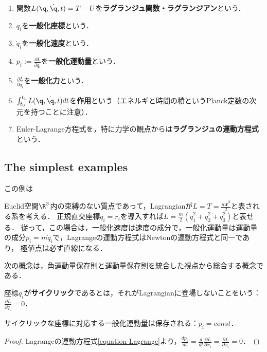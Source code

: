 \documentclass[uplatex, 12pt, dvipdfmx]{jsreport}
\begin{document}
\begin{definition}\mbox{}
    \begin{enumerate}
        \item 関数$L(\q,\dot{\q},t)=T-U$を\textbf{ラグランジュ関数・ラグランジアン}という．
        \item $q_i$を\textbf{一般化座標}という．
        \item $\dot{q}_i$を\textbf{一般化速度}という．
        \item $p_i:=\frac{\partial L}{\partial\dot{q}_i}$を\textbf{一般化運動量}という．
        \item $\frac{\partial L}{\partial q_i}$を\textbf{一般化力}という．
        \item $\int^{t_1}_{t_0}L(\q,\dot{\q},t)dt$を\textbf{作用}という（エネルギと時間の積というPlanck定数の次元を持つことに注意）．
        \item Euler-Lagrange方程式を，特に力学の観点からは\textbf{ラグランジュの運動方程式}という．
    \end{enumerate}
\end{definition}

\subsection{The simplest examples}
この例は

\begin{example}[等速直線運動または静止]
    Euclid空間$\R^3$内の束縛のない質点であって，Lagrangianが$L=T=\frac{m\dot{\mathbf{r}}^2}{2}$と表される系を考える．
    正規直交座標$q_i=r_i$を導入すれば$L=\frac{m}{2}(\dot{q}_1^2+\dot{q}_2^2+\dot{q}_3^2)$と表せる．
    従って，この場合は，一般化速度は速度の成分で，一般化運動量は運動量の成分$p_i=m\dot{q}_i$で，Lagrangeの運動方程式はNewtonの運動方程式と同一であり，
    極値点は必ず直線になる．
\end{example}

\begin{example}[角運動量保存則の言い換え]
    
\end{example}

次の概念は，角運動量保存則と運動量保存則を統合した視点から総合する概念である．

\begin{definition}
    座標$q_i$が\textbf{サイクリック}であるとは，それがLagrangianに登場しないことをいう：$\frac{\partial L}{\partial\dot{q}_i}=0$．
\end{definition}
\begin{theorem}
    サイクリックな座標に対応する一般化運動量は保存される：$p_i=const$．
\end{theorem}
\begin{proof}
    Lagrangeの運動方程式\ref{equation-Lagrange}より，$\frac{dp_i}{dt}=\frac{d}{dt}\frac{\partial L}{\partial \dot{x}_i}=\frac{\partial L}{\partial x_i}=0$．
\end{proof}
\end{document}
